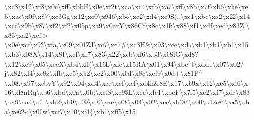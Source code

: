 \textbackslash{}xc8\textbackslash{}x12\textbackslash{}xf8\textbackslash{}x0c\textbackslash{}xff\textbackslash{}xbb\+H\textbackslash{}x0e\textbackslash{}xf2t\textbackslash{}xda\textbackslash{}xc4\textbackslash{}xfb\textbackslash{}xa7\textbackslash{}xff\textbackslash{}x8b\textbackslash{}x7f\textbackslash{}xb6\textbackslash{}xbe\textbackslash{}xeb\textbackslash{}xac\textbackslash{}x0f\textbackslash{}x87\textbackslash{}xc3\+Gg\textbackslash{}x12\textbackslash{}xc0\textbackslash{}x946\textbackslash{}xb5\textbackslash{}xe2\textbackslash{}xd4\textbackslash{}xe9\+S(..\textbackslash{}xc1\textbackslash{}xbc\textbackslash{}xa2\textbackslash{}x22\textbackslash{}x14\textbackslash{}xcc\textbackslash{}x9b\textbackslash{}x87\textbackslash{}xf2\textbackslash{}xf2\textbackslash{}x05p\textbackslash{}xa9\textbackslash{}x0ar\+Y\textbackslash{}x86\+Cf\textbackslash{}x8c\textbackslash{}x1f\+:\textbackslash{}x88\textbackslash{}xf1\textbackslash{}xdf\textbackslash{}xed\textbackslash{}x83\+Z\mbox{]}\textbackslash{}x83\textbackslash{}xa2\textbackslash{}xef$>$\textbackslash{}x0e\textbackslash{}xcf\textbackslash{}x92\textbackslash{}xfa,\textbackslash{}x09\textbackslash{}x01\+Z\+J\textbackslash{}xc7\textbackslash{}xc7\#\textbackslash{}xc3\+H\&\textbackslash{}x93\textbackslash{}xce\textbackslash{}xda\textbackslash{}xb1\textbackslash{}xb1\textbackslash{}xb1\textbackslash{}x15\textbackslash{}xb3\textbackslash{}x08\+X\textbackslash{}x14\textbackslash{}x81\textbackslash{}xcf\textbackslash{}xe7\textbackslash{}x83\textbackslash{}x22\textbackslash{}xcb\textbackslash{}xf6\textbackslash{}xb3\textbackslash{}x08f\+G\textbackslash{}xd8?\textbackslash{}x12\textbackslash{}xc9\textbackslash{}x05\textbackslash{}xee\+X\textbackslash{}xb4\textbackslash{}xff(\textbackslash{}x16\+L\textbackslash{}xfc\textbackslash{}x15\+R\+A\textbackslash{}x01\textbackslash{}x94\textbackslash{}xbe$^\wedge$t\textbackslash{}xddu\textbackslash{}x07\textbackslash{}x02?j\textbackslash{}x82\textbackslash{}xf4\textbackslash{}xc8z\textbackslash{}xfb\textbackslash{}xc5\textbackslash{}xb2\textbackslash{}xc2\textbackslash{}x00\textbackslash{}x0d\textbackslash{}x8c\textbackslash{}xef9\textbackslash{}x0d+\textquotesingle{}\textbackslash{}x81\+P$^\wedge$\textbackslash{}x08.\textbackslash{}x97\textbackslash{}xcby\+Y\textbackslash{}x92\textbackslash{}x04\textbackslash{}xd4\textbackslash{}xcc\textbackslash{}xcf\textbackslash{}xcf\textbackslash{}xd4h\&8\+E\textbackslash{}x17\textbackslash{}xb9x\textbackslash{}x12\textbackslash{}xe5\textbackslash{}xd6\textbackslash{}x16\textbackslash{}xf8n\+Rq\textbackslash{}xb6\textbackslash{}xbd\textbackslash{}x0a\textbackslash{}x0b;\textbackslash{}xcf\+S\textbackslash{}xc9\$\+L\textbackslash{}xec\textbackslash{}xfc1\textbackslash{}xbe\+P\textbackslash{}x7f5\textbackslash{}xc2\textbackslash{}xf7\textbackslash{}xdc\textbackslash{}x83\textbackslash{}xa9\textbackslash{}xa4\textbackslash{}x0e\textbackslash{}xb2\textbackslash{}xb9\textbackslash{}x09\textbackslash{}xf0\textbackslash{}xae\textbackslash{}x08\textbackslash{}x04\textbackslash{}x02\textbackslash{}xce\textbackslash{}xb3@\textbackslash{}x00\textbackslash{}x12e@\textbackslash{}xa5\textbackslash{}xba\textbackslash{}xe62-\/\+:\textbackslash{}x00w\textbackslash{}xcf7\textbackslash{}x10\textbackslash{}xf4\{\textbackslash{}xb1\textbackslash{}xff5\textbackslash{}x15\textbackslas